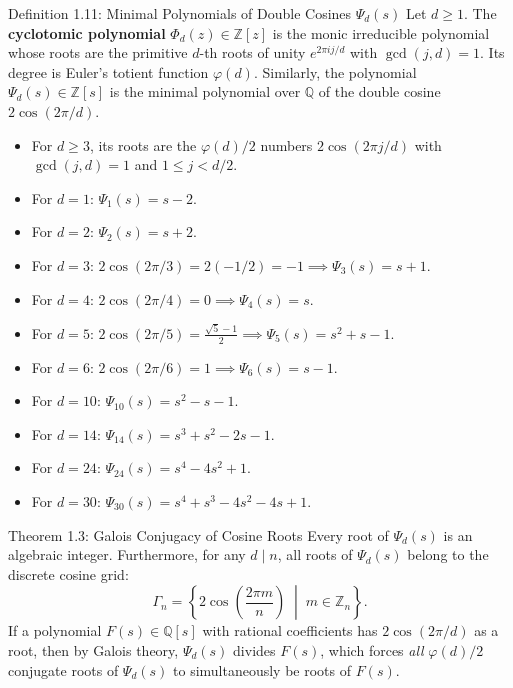 \documentclass[11pt]{article}
\begin{document}
\begin{defbox}{Definition 1.11: Minimal Polynomials of Double Cosines $\Psi_d(s)$}
Let $d \ge 1$. The \textbf{cyclotomic polynomial} $\Phi_d(z) \in \mathbb{Z}[z]$ is the monic irreducible polynomial whose roots are the primitive $d$-th roots of unity $e^{2\pi i j / d}$ with $\gcd(j, d) = 1$. Its degree is Euler's totient function $\varphi(d)$.
Similarly, the polynomial $\Psi_d(s) \in \mathbb{Z}[s]$ is the minimal polynomial over $\mathbb{Q}$ of the double cosine $2\cos(2\pi/d)$. 
\begin{itemize}[leftmargin=*,nosep]
  \item For $d \ge 3$, its roots are the $\varphi(d)/2$ numbers $2\cos(2\pi j / d)$ with $\gcd(j, d) = 1$ and $1 \le j < d/2$.
  \item For $d=1$: $\Psi_1(s) = s - 2$.
  \item For $d=2$: $\Psi_2(s) = s + 2$.
  \item For $d=3$: $2\cos(2\pi/3) = 2(-1/2) = -1 \implies \Psi_3(s) = s + 1$.
  \item For $d=4$: $2\cos(2\pi/4) = 0 \implies \Psi_4(s) = s$.
  \item For $d=5$: $2\cos(2\pi/5) = \frac{\sqrt{5}-1}{2} \implies \Psi_5(s) = s^2 + s - 1$.
  \item For $d=6$: $2\cos(2\pi/6) = 1 \implies \Psi_6(s) = s - 1$.
  \item For $d=10$: $\Psi_{10}(s) = s^2 - s - 1$.
  \item For $d=14$: $\Psi_{14}(s) = s^3 + s^2 - 2s - 1$.
  \item For $d=24$: $\Psi_{24}(s) = s^4 - 4s^2 + 1$.
  \item For $d=30$: $\Psi_{30}(s) = s^4 + s^3 - 4s^2 - 4s + 1$.
\end{itemize}
\end{defbox}

\begin{thmbox}{Theorem 1.3: Galois Conjugacy of Cosine Roots}
Every root of $\Psi_d(s)$ is an algebraic integer. Furthermore, for any $d \mid n$, all roots of $\Psi_d(s)$ belong to the discrete cosine grid:
\begin{equation}
  \Gamma_n = \left\{ 2\cos\left(\frac{2\pi m}{n}\right) \;\middle|\; m \in \mathbb{Z}_n \right\}.
\end{equation}
If a polynomial $F(s) \in \mathbb{Q}[s]$ with rational coefficients has $2\cos(2\pi / d)$ as a root, then by Galois theory, $\Psi_d(s)$ divides $F(s)$, which forces \emph{all} $\varphi(d)/2$ conjugate roots of $\Psi_d(s)$ to simultaneously be roots of $F(s)$.
\end{thmbox}
\end{document}
